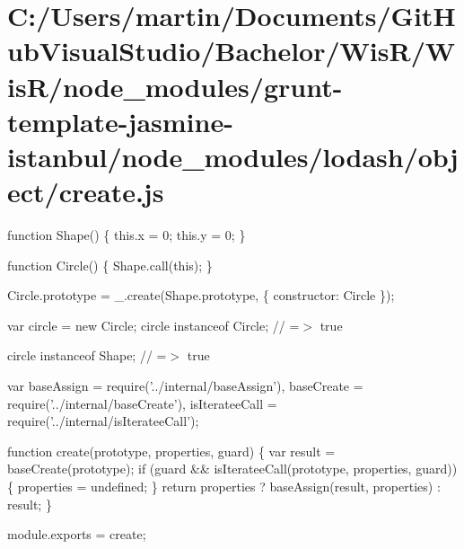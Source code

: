 \hypertarget{_c_1_2_users_2martin_2_documents_2_git_hub_visual_studio_2_bachelor_2_wis_r_2_wis_r_2node_module8530bcdbfdcea7fa7daf496663a07f53}{}\section{C\+:/\+Users/martin/\+Documents/\+Git\+Hub\+Visual\+Studio/\+Bachelor/\+Wis\+R/\+Wis\+R/node\+\_\+modules/grunt-\/template-\/jasmine-\/istanbul/node\+\_\+modules/lodash/object/create.\+js}
function Shape() \{ this.\+x = 0; this.\+y = 0; \}

function Circle() \{ Shape.\+call(this); \}

Circle.\+prototype = \+\_\+.\+create(Shape.\+prototype, \{ \textquotesingle{}constructor\textquotesingle{}\+: Circle \});

var circle = new Circle; circle instanceof Circle; // =$>$ true

circle instanceof Shape; // =$>$ true


\begin{DoxyCodeInclude}
var baseAssign = require(\textcolor{stringliteral}{'../internal/baseAssign'}),
    baseCreate = require(\textcolor{stringliteral}{'../internal/baseCreate'}),
    isIterateeCall = require(\textcolor{stringliteral}{'../internal/isIterateeCall'});

\textcolor{keyword}{function} create(prototype, properties, guard) \{
  var result = baseCreate(prototype);
  \textcolor{keywordflow}{if} (guard && isIterateeCall(prototype, properties, guard)) \{
    properties = undefined;
  \}
  \textcolor{keywordflow}{return} properties ? baseAssign(result, properties) : result;
\}

module.exports = create;
\end{DoxyCodeInclude}
 